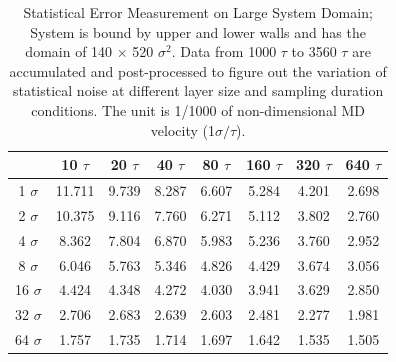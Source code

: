 \documentclass[preprint,12pt]{elsarticle}
\begin{document}
\begin{table}
  \caption{\small Statistical Error Measurement on Large System Domain; System is bound by upper and lower walls and has the domain of 140 $\times$ 520 ${\sigma}^2$. Data from 1000 $\tau$ to 3560 $\tau$ are accumulated and post-processed to figure out the variation of statistical noise at different layer size and sampling duration conditions. The unit is 1/1000 of non-dimensional MD velocity (1$\sigma / \tau$).}
  \label{table:MD_Vel0_L}
  \centering
    \resizebox{0.8\linewidth}{!} {
  \begin{tabular}{c || c c c c c c c}
\hline
	&	10 $\tau$	&	20 $\tau$	&	40 $\tau$	&	80 $\tau$	&	160 $\tau$	&	320 $\tau$	&	640 $\tau$	\\
\hline
1 $\sigma$	&	11.711 	&	9.739 	&	8.287 	&	6.607 	&	5.284 	&	4.201 	 &	2.698 	\\
2 $\sigma$	&	10.375 	&	9.116 	&	7.760 	&	6.271 	&	5.112 	&	3.802 	 &	2.760 	\\
4 $\sigma$	&	8.362 	&	7.804 	&	6.870 	&	5.983 	&	5.236 	&	3.760 	 &	2.952 	\\
8 $\sigma$	&	6.046 	&	5.763 	&	5.346 	&	4.826 	&	4.429 	&	3.674 	 &	3.056 	\\
16 $\sigma$	&	4.424 	&	4.348 	&	4.272 	&	4.030 	&	3.941 	&	3.629 	 &	2.850 	\\
32 $\sigma$	&	2.706 	&	2.683 	&	2.639 	&	2.603 	&	2.481 	&	2.277 	 &	1.981 	\\
64 $\sigma$	&	1.757 	&	1.735 	&	1.714 	&	1.697 	&	1.642 	&	1.535 	 &	1.505 	\\
\hline
\end{tabular} }
\vspace{-1em}
\end{table}
\end{document}
